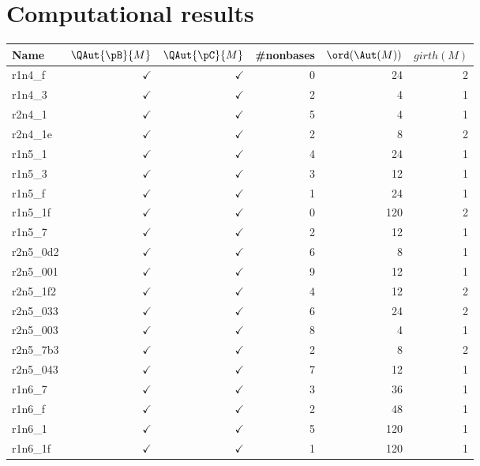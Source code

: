 
\appendix
\section{Computational results}
\begin{center}
\small
\begin{longtable}{|l|r|r|r|r|r|}
 \hline  
  \textbf{Name} & \textbf{$\QAut{\pB}{M}$} & \textbf{$\QAut{\pC}{M}$} & \textbf{#nonbases} & \textbf{$\ord(\Aut(M))$} & \textbf{$girth(M)$} \\ \hline
  r1n4\_f & $\checkmark$ & $\checkmark$ & 0 & 24 & 2 \\ \hline
  r1n4\_3 & $\checkmark$ & $\checkmark$ & 2 & 4 & 1 \\ \hline
  r2n4\_1 & $\checkmark$ & $\checkmark$ & 5 & 4 & 1 \\ \hline
  r2n4\_1e & $\checkmark$ & $\checkmark$ & 2 & 8 & 2 \\ \hline
  r1n5\_1 & $\checkmark$ & $\checkmark$ & 4 & 24 & 1 \\ \hline
  r1n5\_3 & $\checkmark$ & $\checkmark$ & 3 & 12 & 1 \\ \hline
  r1n5\_f & $\checkmark$ & $\checkmark$ & 1 & 24 & 1 \\ \hline
  r1n5\_1f & $\checkmark$ & $\checkmark$ & 0 & 120 & 2 \\ \hline
  r1n5\_7 & $\checkmark$ & $\checkmark$ & 2 & 12 & 1 \\ \hline
  r2n5\_0d2 & $\checkmark$ & $\checkmark$ & 6 & 8 & 1 \\ \hline
  r2n5\_001 & $\checkmark$ & $\checkmark$ & 9 & 12 & 1 \\ \hline
  r2n5\_1f2 & $\checkmark$ & $\checkmark$ & 4 & 12 & 2 \\ \hline
  r2n5\_033 & $\checkmark$ & $\checkmark$ & 6 & 24 & 2 \\ \hline
  r2n5\_003 & $\checkmark$ & $\checkmark$ & 8 & 4 & 1 \\ \hline
  r2n5\_7b3 & $\checkmark$ & $\checkmark$ & 2 & 8 & 2 \\ \hline
  r2n5\_043 & $\checkmark$ & $\checkmark$ & 7 & 12 & 1 \\ \hline
  r1n6\_7 & $\checkmark$ & $\checkmark$ & 3 & 36 & 1 \\ \hline
  r1n6\_f & $\checkmark$ & $\checkmark$ & 2 & 48 & 1 \\ \hline
  r1n6\_1 & $\checkmark$ & $\checkmark$ & 5 & 120 & 1 \\ \hline
  r1n6\_1f & $\checkmark$ & $\checkmark$ & 1 & 120 & 1 \\ \hline

\end{longtable}
\end{center}
